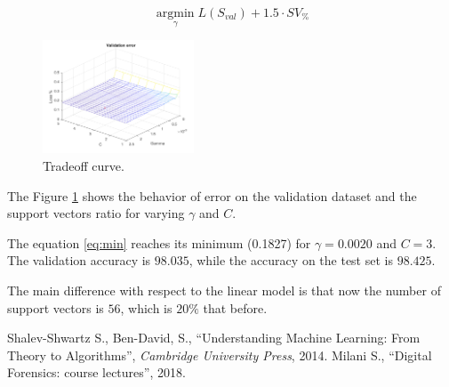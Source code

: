 \documentclass[a4paper, 11pt]{article}
\DeclareMathOperator*{\argmin}{argmin}
\begin{document}
\begin{equation}\label{eq:min}
\argmin\limits_{\gamma} L(S_{val}) + 1.5 \cdot SV_{\%}
\end{equation}

\begin{figure}[H]
	\centering
	\includegraphics[width=0.4\textwidth]{s2_tradeoff_valerr_gamma_c}
	\caption{Tradeoff curve.}
	\label{fig:s2_tradeoff_valerr_gamma_c}
\end{figure}
The Figure \ref{fig:s2_tradeoff_valerr_gamma_c} shows the behavior of error on the validation dataset and the support vectors ratio for varying $\gamma$ and $C$.

The equation \ref{eq:min} reaches its minimum (0.1827) for $\gamma=0.0020$ and $C=3$. The validation accuracy is $98.035$, while the accuracy on the test set is $98.425$.

The main difference with respect to the linear model is that now the number of support vectors is $56$, which is $20\%$ that before.

\begin{thebibliography}{1}
	{Shalev-Shwartz S., Ben-David, S.}, ``Understanding Machine Learning: From Theory to Algorithms'', \textit{Cambridge University Press}, 2014.
	{Milani S.}, ``Digital Forensics: course lectures'', 2018.
\end{thebibliography}
\end{document}
